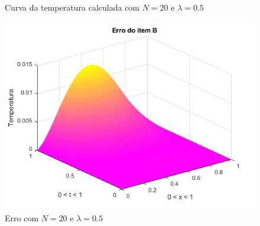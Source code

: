 \documentclass[12pt]{article}
\begin{document}
\begin{spacing}{1.5}
\begin{figure}
    \caption{Curva da temperatura calculada com $N=20$ e $\lambda=0.5$}
    \label{fig:B_n20lambda0-5_calc}
\end{figure}
\begin{figure}
    \centering
    \includegraphics[width=0.8\linewidth]{Primeira_Tarefa/ItemB/n20_lambda0-5_erro.png}
    \caption{Erro com $N=20$ e $\lambda=0.5$}
    \label{fig:B_n20lambda0-5_erro}
\end{figure}



\end{spacing}
\end{document}
